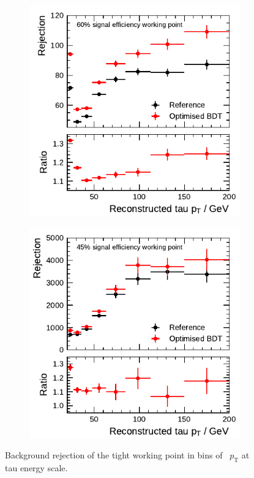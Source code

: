 \begin{figure}[htbp]
  \centering
  \begin{subfigure}[t]{0.48\textwidth}
    \centering
    \includegraphics{./figures/bdt_perf/post_optimisation/rejection_tight_1p.pdf}
  \end{subfigure}\hfill
  \begin{subfigure}[t]{0.48\textwidth}
    \centering
    \includegraphics{./figures/bdt_perf/post_optimisation/rejection_tight_3p.pdf}
  \end{subfigure}
  \caption[Background rejection of the tight working point in bins of
  \tauhadvis~\pt for the BDT-based identification after optimisation]{Background
    rejection of the tight working point in bins of \tauhadvis~$p_\text{T}$ at
    tau energy scale.}
  \label{fig:rejection_comparison}
\end{figure}

